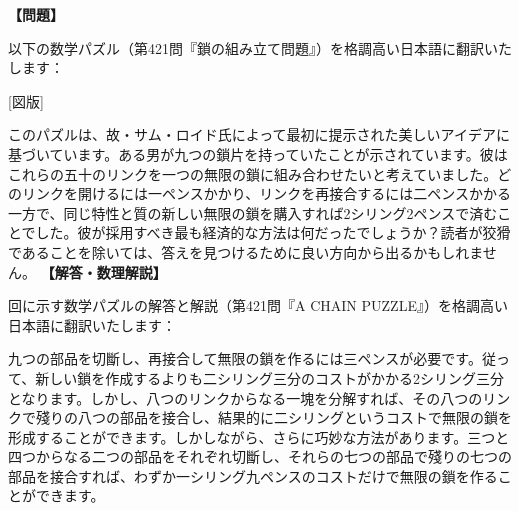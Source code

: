 \documentclass[10pt,a4paper,oneside,openany]{ltjsbook}
\begin{document}
\begin{tcolorbox}[colback=softblue,colframe=primaryblue,title=\textbf{第 421 問：鎖のようにつながれたパズル （原題: A CHAIN PUZZLE.）},arc=2mm,boxrule=1pt,breakable]
\textbf{【問題】}\par\vspace{0.3em}
以下の数学パズル（第421問『鎖の組み立て問題』）を格調高い日本語に翻訳いたします：

[図版]

このパズルは、故・サム・ロイド氏によって最初に提示された美しいアイデアに基づいています。ある男が九つの鎖片を持っていたことが示されています。彼はこれらの五十のリンクを一つの無限の鎖に組み合わせたいと考えていました。どのリンクを開けるには一ペンスかかり、リンクを再接合するには二ペンスかかる一方で、同じ特性と質の新しい無限の鎖を購入すれば2シリング2ペンスで済むことでした。彼が採用すべき最も経済的な方法は何だったでしょうか？読者が狡猾であることを除いては、答えを見つけるために良い方向から出るかもしれません。
\tcblower
\textbf{【解答・数理解説】}\par\vspace{0.3em}
回に示す数学パズルの解答と解説（第421問『A CHAIN PUZZLE』）を格調高い日本語に翻訳いたします：

九つの部品を切斷し、再接合して無限の鎖を作るには三ペンスが必要です。従って、新しい鎖を作成するよりも二シリング三分のコストがかかる2シリング三分となります。しかし、八つのリンクからなる一塊を分解すれば、その八つのリンクで殘りの八つの部品を接合し、結果的に二シリングというコストで無限の鎖を形成することができます。しかしながら、さらに巧妙な方法があります。三つと四つからなる二つの部品をそれぞれ切斷し、それらの七つの部品で殘りの七つの部品を接合すれば、わずか一シリング九ペンスのコストだけで無限の鎖を作ることができます。
\end{tcolorbox}
\end{document}
